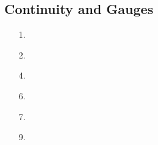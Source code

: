 \documentclass[letter paper, 11pt]{article}
\begin{document}
\subsection{Continuity and Gauges}
\begin{itemize}
    \item[1.] 
    
    \item[2.]
    
    \item[4.]
    
    \item[6.]
    
    \item[7.]
    
    \item[9.]
    
\end{itemize}
\end{document}
